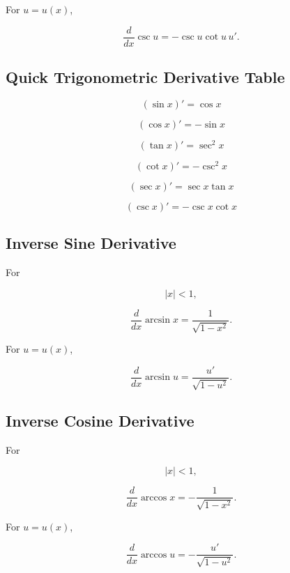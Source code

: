 For \(u=u(x)\),

\[
\boxed{
\frac{d}{dx}\csc u
=
-\csc u\cot u\,u'.
}
\]

\subsection{Quick Trigonometric Derivative Table}
\label{subsec:quick-trig-derivative-table}

\[
\boxed{
(\sin x)'=\cos x
}
\]

\[
\boxed{
(\cos x)'=-\sin x
}
\]

\[
\boxed{
(\tan x)'=\sec^2x
}
\]

\[
\boxed{
(\cot x)'=-\csc^2x
}
\]

\[
\boxed{
(\sec x)'=\sec x\tan x
}
\]

\[
\boxed{
(\csc x)'=-\csc x\cot x
}
\]

\subsection{Inverse Sine Derivative}
\label{subsec:inverse-sine-derivative}

For

\[
|x|<1,
\]

\[
\boxed{
\frac{d}{dx}\arcsin x
=
\frac{1}{\sqrt{1-x^2}}.
}
\]

For \(u=u(x)\),

\[
\boxed{
\frac{d}{dx}\arcsin u
=
\frac{
u'
}{
\sqrt{1-u^2}
}.
}
\]

\subsection{Inverse Cosine Derivative}
\label{subsec:inverse-cosine-derivative}

For

\[
|x|<1,
\]

\[
\boxed{
\frac{d}{dx}\arccos x
=
-\frac{1}{\sqrt{1-x^2}}.
}
\]

For \(u=u(x)\),

\[
\boxed{
\frac{d}{dx}\arccos u
=
-\frac{
u'
}{
\sqrt{1-u^2}
}.
}
\]

